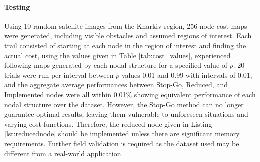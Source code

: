 \paragraph{Testing}
Using 10 random satellite images from the Kharkiv region, 256 node cost maps were generated, including visible obstacles and assumed regions of interest. Each trail consisted of starting at each node in the region of interest and finding the actual cost, using the values given in Table \ref{tab:cost_values}, experienced following maps generated by each nodal structure for a specified value of $p$. 20 trials were run per interval between $p$ values 0.01 and 0.99 with intervals of 0.01, and the aggregate average performances between Stop-Go, Reduced, and Implemented nodes were all within 0.01\% showing equivalent performance of each nodal structure over the dataset. However, the Stop-Go method can no longer guarantee optimal results, leaving them vulnerable to unforeseen situations and varying cost functions. Therefore, the reduced node given in Listing \ref{lst:reducednode} should be implemented unless there are significant memory requirements. Further field validation is required as the dataset used may be different from a real-world application.



\begin{comment}
\paragraph{Exhaustive Search}
The simplest algorithm is the recursive function shown in Algorithm \ref{alg: search}. There are steps taken to increase the efficiency, including pruning lines that already exceed the minimum cost as the cost is monotonic increasing, and automatically terminating lines when they can land safely. However, the worst-case time complexity remains $O(|V|6^{depth})$ as each node has 6 neighbours that get called recursively. To get guaranteed correct results, it would require searching all paths as long as $|V|$, as costs cannot fall below 0, so it is never advantageous to revisit a node. Therefore, the worst-case complexity for guaranteed optimal paths is $O(|V|6^{|V|})$. This is not usable for practical applications, therefore, it requires a compromise on the depth of search, no longer getting optimal path results.
\end{comment}